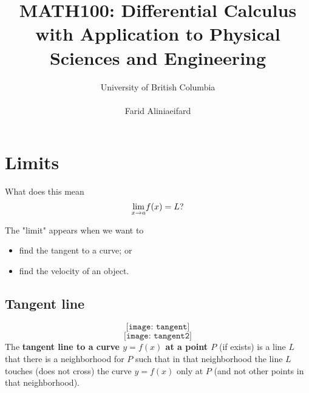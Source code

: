 \documentclass[12pt,a4paper]{book}
\numberwithin{equation}{section}
\begin{document}


 \title{MATH100: Differential Calculus with Application to Physical Sciences and Engineering}
 \author{University of British Columbia\\ \\Farid Aliniaeifard}


\maketitle

\tableofcontents



\chapter{Limits}
What does this mean  $$\underset{x\rightarrow a}{\rm lim}f(x)=L?$$

The "limit" appears when we want to
\begin{itemize}
	\item find the tangent to a curve; or 
	\item find the velocity of an object.
\end{itemize} 
\section{  Tangent line}





$$
	\texttt{[image: tangent]}
$$
$$
\texttt{[image: tangent2]}
$$
The {\bf tangent line to a curve $y=f(x)$ at a point $P$} (if exists) is a line $L$ that there is a neighborhood for $P$ such that in that  neighborhood the line $L$ touches (does not cross) the curve $y=f(x)$ only at $P$ (and not other points in that neighborhood).
\end{document}
